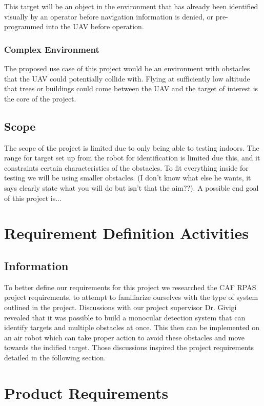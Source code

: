 \documentclass[]{report}
\begin{document}
This target will be an object in the environment that has already been identified visually by an operator before navigation information is denied, or pre-programmed into the UAV before operation.

\subsection{Complex Environment}

The proposed use case of this project would be an environment with obstacles that the UAV could potentially collide with. Flying at sufficiently low altitude that trees or buildings could come between the UAV and the target of interest is the core of the project.


\section{Scope}
The scope of the project is limited due to only being able to testing indoors. The range for target set up from the robot for identification is limited due this, and it constraints certain characteristics of the obstacles. To fit everything inside for testing we will be using smaller obstacles. 
(I don't know what else he wants, it says clearly state what you will do but isn't that the aim??).
A possible end goal of this project is...  
 

\chapter{Requirement Definition Activities}

\section{Information}

To better define our requirements for this project we researched the CAF RPAS project requirements, to attempt to familiarize ourselves with the type of system outlined in the project. 
Discussions with our project supervisor Dr. Givigi revealed that it was possible to build a monocular detection system that can identify targets and multiple obstacles at once. This then can be implemented on an air robot which can take proper action to avoid these obstacles and move towards the indified target. Those discussions inspired the project requirements detailed in the following section.


\chapter{Product Requirements}
\end{document}
